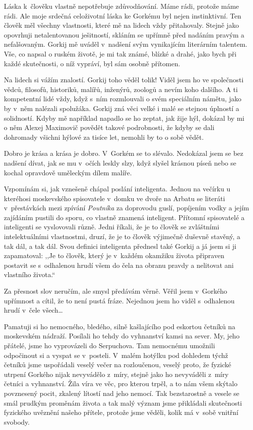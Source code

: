 Láska k člověku vlastně nepotřebuje zdůvodňování. Máme rádi, protože máme rádi. Ale moje srdečná celoživotní láska ke Gorkému byl nejen instinktivní. Ten člověk měl všechny vlastnosti, které mě na lidech vždy přitahovaly. Stejně jako opovrhuji netalentovanou ješitností, skláním se upřímně před nadáním pravým a nefalšovaným. Gorkij mě uváděl v nadšení svým vynikajícím literárním talentem. Vše, co napsal o ruském životě, je mi tak známé, blízké a drahé, jako bych při každé skutečnosti, o níž vypráví, byl sám osobně přítomen.

Na lidech si vážím znalostí. Gorkij toho věděl tolik! Viděl jsem ho ve společnosti vědců, filosofů, historiků, malířů, inženýrů, zoologů a nevím koho dalšího. A ti kompetentní lidé vždy, když s ním rozmlouvali o svém speciálním námětu, jako by v něm nalézali spolužáka. Gorkij zná věci velké i malé se stejnou úplností a solidností. Kdyby mě například napadlo se ho zeptat, jak žije hýl, dokázal by mi o něm Alexej Maximovič povědět takové podrobnosti, že kdyby se dali dohromady všichni hýlové za tisíce let, nemohli by to o sobě vědět.

Dobro je krása a krása je dobro. V Gorkém se to slévalo. Nedokázal jsem se bez nadšení dívat, jak se mu v očích leskly slzy, když slyšel krásnou píseň nebo se kochal opravdově uměleckým dílem malíře. 

Vzpomínám si, jak vznešeně chápal poslání inteligenta. Jednou na večírku u kteréhosi moskevského spisovatele v domku ve dvoře na Arbatu se literáti v přestávkách mezi zpívání \textit{Poutníka} za doprovodu guslí, popíjením vodky a jejím zajídáním pustili do sporu, co vlastně znamená inteligent. Přítomní spisovatelé a inteligenti se vyslovovali různě. Jedni říkali, že je to člověk se zvláštními intelektuálními vlastnostmi, druzí, že je to člověk výjimečně duševně stavěný, a tak dál, a tak dál. Svou definici inteligenta přednesl také Gorkij a já jsem si ji zapamatoval: ,,Je to člověk, který je v každém okamžiku života připraven postavit se s odhalenou hrudí všem do čela na obranu pravdy a nelitovat ani vlastního života.``

Za přesnost slov neručím, ale smysl předávám věrně. Věřil jsem v Gorkého upřímnost a cítil, že to není pustá fráze. Nejednou jsem ho viděl s odhalenou hrudí v čele všech\ldots

Pamatuji si ho nemocného, bledého, silně kašlajícího pod eskortou četníků na moskevském nádraží. Posílali ho tehdy do vyhnanství kamsi na sever. My, jeho přátelé, jsme ho vyprovázeli do Serpuchova. Tam nemocnému umožnili odpočinout si a vyspat se v posteli. V malém hotýlku pod dohledem týchž četníků jsme uspořádali veselý večer na rozloučenou, veselý proto, že fyzické utrpení Gorkého nijak nevyvádělo z míry, stejně jako ho nevyváděli z míry četníci a vyhnanství. Žila víra ve věc, pro kterou trpěl, a to nám všem skýtalo povznesený pocit, zkalený lítostí nad jeho nemocí. Tak bezstarostně a vesele se smál prudkým proměnám života a tak malý význam jsme přikládali skutečnosti fyzického uvěznění našeho přítele, protože jsme věděli, kolik má v sobě vnitřní svobody. 

